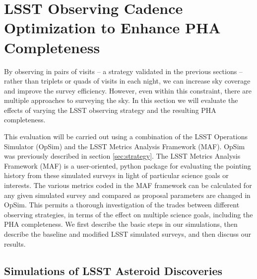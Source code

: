 \section{LSST Observing Cadence Optimization to Enhance PHA Completeness \label{sec:opsim}}

By observing in pairs of visits -- a strategy validated in the previous sections -- rather than triplets or quads of visits in each night, we can increase sky coverage and improve the survey efficiency. However, even within this constraint, there are multiple approaches to surveying the sky. In this section we will evaluate the effects of varying the LSST observing strategy and the resulting PHA completeness.

This evaluation will be carried out using a combination of the LSST Operations Simulator (OpSim) and the LSST Metrics Analysis Framework (MAF).
OpSim was previously described in section \ref{sec:strategy}. 
The LSST Metrics Analysis Framework (MAF) is a user-oriented, python package for evaluating the pointing history
from these simulated surveys in light of particular science goals or interests. The various metrics coded in the
MAF framework can be calculated for any given simulated survey and compared as proposal parameters are changed
in OpSim. This permits a thorough investigation of the trades between different observing strategies, in terms of the
effect on multiple science goals, including the PHA completeness.  We first describe the basic steps in our simulations,
then describe the baseline and modified LSST simulated surveys, and then discuss our results.


\subsection{Simulations of LSST Asteroid Discoveries}

